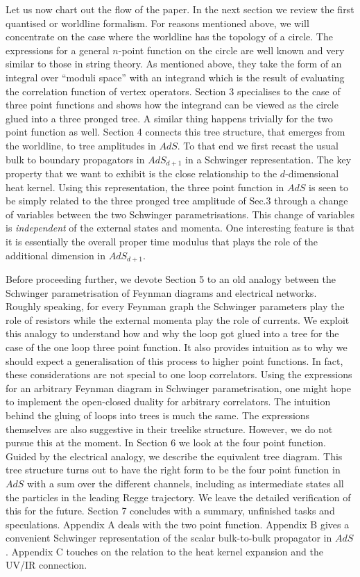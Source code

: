 
Let us now chart out the flow of the paper.
In the next section we review the first quantised or worldline formalism. For reasons 
mentioned above, we will  
concentrate on the case where the worldline has the topology of a circle. The 
expressions for a general $n$-point function on the circle are well known and very similar to those
in string theory. As mentioned above, they take the form of an integral over 
``moduli space'' with an integrand which is the result of evaluating the correlation
function of vertex operators. 
Section 3 specialises to the case of three point functions and shows how the integrand
can be viewed as the circle glued into a three pronged tree. A similar thing happens 
trivially for the two point function as well. 
Section 4 connects this tree structure, that emerges from the worldline, to tree amplitudes
in $AdS$. To that end we first recast the usual bulk to boundary 
propagators in $AdS_{d+1}$ in a Schwinger 
representation. The key property that we want to exhibit is the close relationship to
the $d$-dimensional heat kernel. 
Using this representation, the three point function
in $AdS$ is seen to be simply related to the three pronged tree
amplitude of Sec.3 through a change of variables between the two Schwinger parametrisations.
This change of variables is {\it independent} of the external states and momenta. 
One interesting feature is that it is essentially the overall proper time modulus
that plays the role of
the additional dimension in $AdS_{d+1}$. 

Before proceeding further, we devote
Section 5 to an 
old analogy between the Schwinger parametrisation of Feynman diagrams and electrical networks.
Roughly speaking, for every Feynman graph 
the Schwinger parameters play the role of resistors while the external 
momenta play the role of currents. We exploit this analogy to understand 
how and why the loop got glued into a tree for the case of the one loop three point function.   
It also
provides intuition as to why we should expect a 
generalisation of this process to higher point functions. In fact, these considerations are not 
special to one loop correlators. Using  
the expressions for an arbitrary Feynman diagram in Schwinger parametrisation, one
might hope to implement the open-closed duality for arbitrary correlators. The intuition behind
the gluing of loops into trees is much the same. The expressions themselves are also
suggestive in their treelike structure. However, we do not pursue this at the moment.  
In Section 6 we look at the four point function. Guided by the electrical analogy,
we describe the equivalent tree diagram. This tree structure 
turns out to have the right form to be the 
four point function in $AdS$ with a sum over the different channels, including as  
intermediate states all the particles in the leading Regge trajectory. We leave the detailed
verification of this for the future.
Section 7 concludes with a summary, unfinished tasks and speculations. 
Appendix A deals with the two point function. Appendix B gives a convenient 
Schwinger representation of the scalar bulk-to-bulk propagator in $AdS$.
Appendix C touches on the relation 
to the heat kernel expansion and the UV/IR connection. 


